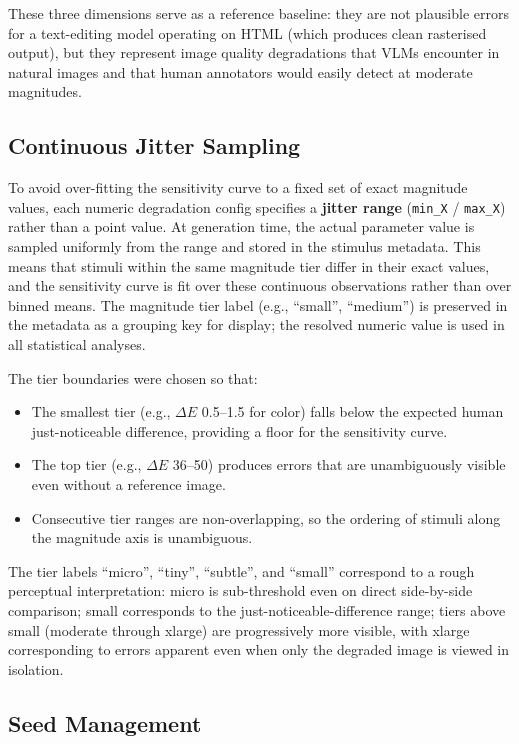 These three dimensions serve as a reference baseline: they are not plausible errors for a text-editing model operating on HTML (which produces clean rasterised output), but they represent image quality degradations that VLMs encounter in natural images and that human annotators would easily detect at moderate magnitudes.

\subsection{Continuous Jitter Sampling} \label{Continuous Jitter Sampling}

To avoid over-fitting the sensitivity curve to a fixed set of exact magnitude values, each numeric degradation config specifies a \textbf{jitter range} (\texttt{min\_X} / \texttt{max\_X}) rather than a point value. At generation time, the actual parameter value is sampled uniformly from the range and stored in the stimulus metadata. This means that stimuli within the same magnitude tier differ in their exact values, and the sensitivity curve is fit over these continuous observations rather than over binned means. The magnitude tier label (e.g., ``small'', ``medium'') is preserved in the metadata as a grouping key for display; the resolved numeric value is used in all statistical analyses.

The tier boundaries were chosen so that:
\begin{itemize}
    \item The smallest tier (e.g., $\Delta E$ 0.5--1.5 for color) falls below the expected human just-noticeable difference, providing a floor for the sensitivity curve.
    \item The top tier (e.g., $\Delta E$ 36--50) produces errors that are unambiguously visible even without a reference image.
    \item Consecutive tier ranges are non-overlapping, so the ordering of stimuli along the magnitude axis is unambiguous.
\end{itemize}

The tier labels ``micro'', ``tiny'', ``subtle'', and ``small'' correspond to a rough perceptual interpretation: micro is sub-threshold even on direct side-by-side comparison; small corresponds to the just-noticeable-difference range; tiers above small (moderate through xlarge) are progressively more visible, with xlarge corresponding to errors apparent even when only the degraded image is viewed in isolation.

\subsection{Seed Management}

